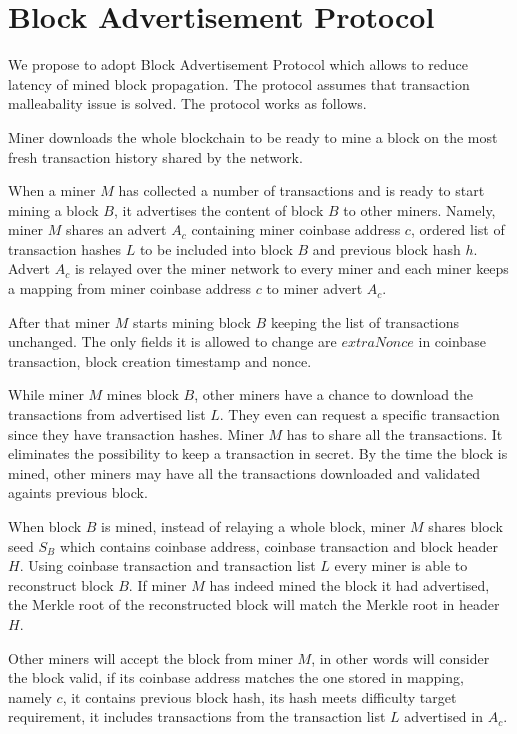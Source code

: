 \documentclass[12pt]{elsarticle}
\begin{document}
\section{Block Advertisement Protocol}
\label{advertisement_protocol}

We propose to adopt Block Advertisement Protocol which allows to reduce latency of mined block propagation. The protocol assumes that transaction malleabality issue is solved. The protocol works as follows.

Miner downloads the whole blockchain to be ready to mine a block on the most fresh transaction history shared by the network.

When a miner $M$ has collected a number of transactions and is ready to start mining a block $B$, it advertises the content of block $B$ to other miners. Namely, miner $M$ shares an advert $A_c$ containing miner coinbase address $c$, ordered list of transaction hashes $L$ to be included into block $B$ and previous block hash $h$. Advert $A_c$ is relayed over the miner network to every miner and each miner keeps a mapping from miner coinbase address $c$ to miner advert $A_c$.

After that miner $M$ starts mining block $B$ keeping the list of transactions unchanged. The only fields it is allowed to change are $extraNonce$ in coinbase transaction, block creation timestamp and nonce.

While miner $M$ mines block $B$, other miners have a chance to download the transactions from advertised list $L$. They even can request a specific transaction since they have transaction hashes. Miner $M$ has to share all the transactions. It eliminates the possibility to keep a transaction in secret. By the time the block is mined, other miners may have all the transactions downloaded and validated againts previous block.

When block $B$ is mined, instead of relaying a whole block, miner $M$ shares block seed $S_B$ which contains coinbase address, coinbase transaction and block header $H$. Using coinbase transaction and transaction list $L$ every miner is able to reconstruct block $B$. If miner $M$ has indeed mined the block it had advertised, the Merkle root of the reconstructed block will match the Merkle root in header $H$. 

Other miners will accept the block from miner $M$, in other words will consider the block valid, if its coinbase address matches the one stored in mapping, namely $c$, it contains previous block hash, its hash meets difficulty target requirement, it includes transactions from the transaction list $L$ advertised in $A_c$.
\end{document}
